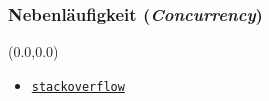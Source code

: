 \documentclass[aspectratio=169, 14pt]{beamer}
\begin{document}
\begin{frame}
    \frametitle{Nebenläufigkeit (\textit{Concurrency})}
    \begin{textblock*}{2\paperwidth}(0.0\paperwidth,0.0\paperheight)
        \vspace*{2.0cm}
        \begin{itemize}
            \setlength\itemsep{16pt}
            \item \textcolor{uniblau}{\href{https://stackoverflow.com/questions/13954193/is-process-in-vhdl-reentrant/}{\texttt{stackoverflow}}}
        \end{itemize}
    \end{textblock*}
    \framenumber
\end{frame}


\end{document}

